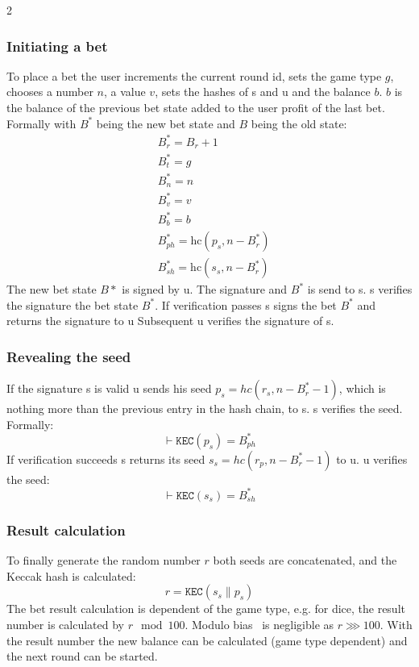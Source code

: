 \documentclass[oneside]{amsart}
\makeatletter
\newcommand*\eg{e.g.\@\xspace}
\newcommand{\kec}{\texttt{KEC}}
\newcommand{\conc}{\mathbin{\|}}
\makeatother
\begin{document}
\begin{multicols}{2}
\subsubsection{Initiating a bet}
To place a bet the user increments the current round id, sets the game type $g$, chooses a number $n$, a value $v$, sets
the hashes of \gls{s} and \gls{u} and the balance $b$. $b$ is the balance of the previous bet state added to
the user profit of the last bet.
Formally with $B^*$ being the new bet state and $B$ being the old state:
\begin{align}
    &B^*_r = B_r + 1 \\
    &B^*_t = g \\
    &B^*_n = n \\
    &B^*_v = v \\
    &B^*_b = b \\
    &B^*_{ph} = \text{hc}(p_s, n - B^*_r) \\
    &B^*_{sh} = \text{hc}(s_s, n - B^*_r)
\end{align}
The new bet state $B*$ is signed by \gls{u}. %
The signature and $B^*$ is send to \gls{s}.
\Gls{s} verifies the signature the bet state $B^*$. %
If verification passes \gls{s} signs the bet $B^*$ and returns the signature to \gls{u}
Subsequent \gls{u} verifies the signature of \gls{s}.

\subsubsection{Revealing the seed}
If the signature \gls{s} is valid \gls{u} sends his seed $p_s = hc(r_s, n - B^*_r - 1)$, which is
nothing more than the previous entry in the hash chain, to \gls{s}.
\Gls{s} verifies the seed. Formally:
\begin{equation}
    \vdash \kec(p_s) = B^*_{ph}
\end{equation}
If verification succeeds \gls{s} returns its seed $s_s = hc(r_p, n - B^*_r - 1)$ to \gls{u}.
\Gls{u} verifies the seed:
\begin{equation}
    \vdash \kec(s_s) = B^*_{sh}
\end{equation}

\subsubsection{Result calculation}
To finally generate the random number $r$ both seeds are concatenated, and the Keccak hash is calculated:
\begin{equation}
    r = \kec(s_s \conc p_s)
\end{equation}
The bet result calculation is dependent of the game type,
\eg for dice, the result number is calculated by $r \mod 100$.
Modulo bias~\cite{moduloBias} is negligible as $r \ggg 100$.
With the result number the new balance can be calculated (game type dependent) and the next round can be started.


\end{multicols}
\end{document}
